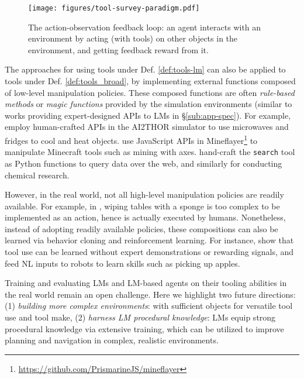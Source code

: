 \begin{wrapfigure}[18]{r}{0.43\textwidth}
\vspace{-4mm}
\footnotesize
    \texttt{[image: figures/tool-survey-paradigm.pdf]}
\vspace{-6mm}
\caption{The action-observation feedback loop: an agent interacts with an environment by acting (with tools) on other objects in the environment, and getting feedback reward from it.}
\label{fig:agent-env}
\end{wrapfigure}



The approaches for using tools under Def. \ref{def:tools-lm} can also be applied to tools under Def. \ref{def:tools_broad}, by implementing external functions composed of low-level manipulation policies. 
These composed functions are often \textit{rule-based methods} or \textit{magic functions} provided by the simulation environments (similar to works providing expert-designed APIs to LMs in \S\ref{sub:app-spec}). For example, \citet{shridhar2020alfred} employ human-crafted APIs in the AI2THOR simulator \citep{kolve2017ai2} to use microwaves and fridges to cool and heat objects.  
\citet{wang2023voyager} use JavaScript APIs in Mineflayer\footnote{\url{https://github.com/PrismarineJS/mineflayer}} to manipulate Minecraft tools such as mining with axes. \citet{liu2024agentbench} hand-craft the \texttt{search} tool as Python functions to query data over the web, and \citet{boiko2023autonomous} similarly for conducting chemical research.

However, in the real world, not all high-level manipulation policies are readily available. For example, in \citet{ahn2022saycan}, %
wiping tables with a sponge is too complex to be implemented as an action, hence is actually executed by humans.
Nonetheless, instead of adopting readily available policies, these compositions can also be learned via behavior cloning and reinforcement learning.
For instance, \citet{baker2019emergent} show that tool use can be learned without expert demonstrations or rewarding signals, and \citet{yu2023language} feed NL inputs to robots to learn skills such as picking up apples.

Training and evaluating LMs and LM-based agents on their tooling abilities in the real world remain an open challenge.
Here we highlight two future directions: (1) \textit{building more complex environments}: with sufficient objects for versatile tool use and tool make, (2) \textit{harness LM procedural knowledge}: LMs equip strong procedural knowledge via extensive training, which can be utilized to improve planning and navigation in complex, realistic environments. 
